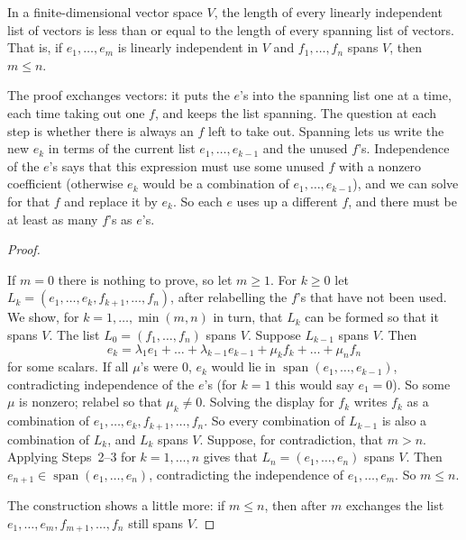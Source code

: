 \documentclass[10pt]{scrartcl}
\DeclareMathOperator{\spn}{span}
\begin{document}
\begin{theorem*}
  In a finite-dimensional vector space $V$, the length of every linearly independent list of vectors is less than or equal to the length of every spanning list of vectors. That is, if $e_1,\dots,e_m$ is linearly independent in $V$ and $f_1,\dots,f_n$ spans $V$, then $m\le n$.
\end{theorem*}
\begin{ideabox}
  The proof exchanges vectors: it puts the $e$'s into the spanning list one at a time, each time taking out one $f$, and keeps the list spanning. The question at each step is whether there is always an $f$ left to take out. Spanning lets us write the new $e_k$ in terms of the current list $e_1,\dots,e_{k-1}$ and the unused $f$'s. Independence of the $e$'s says that this expression must use some unused $f$ with a nonzero coefficient (otherwise $e_k$ would be a combination of $e_1,\dots,e_{k-1}$), and we can solve for that $f$ and replace it by $e_k$. So each $e$ uses up a different $f$, and there must be at least as many $f$'s as $e$'s.
\end{ideabox}
\begin{proof}
  \begin{steps}
    \ii If $m=0$ there is nothing to prove, so let $m\ge1$. For $k\ge0$ let $L_k=(e_1,\dots,e_k,f_{k+1},\dots,f_n)$, after relabelling the $f$'s that have not been used. We show, for $k=1,\dots,\min(m,n)$ in turn, that $L_k$ can be formed so that it spans $V$. The list $L_0=(f_1,\dots,f_n)$ spans $V$.
    \ii Suppose $L_{k-1}$ spans $V$. Then
    \[
      e_k=\lambda_1e_1+\dots+\lambda_{k-1}e_{k-1}+\mu_kf_k+\dots+\mu_nf_n
    \]
    for some scalars. If all $\mu$'s were $0$, $e_k$ would lie in $\spn(e_1,\dots,e_{k-1})$, contradicting independence of the $e$'s (for $k=1$ this would say $e_1=0$). So some $\mu$ is nonzero; relabel so that $\mu_k\ne0$.
    \ii Solving the display for $f_k$ writes $f_k$ as a combination of $e_1,\dots,e_k,f_{k+1},\dots,f_n$. So every combination of $L_{k-1}$ is also a combination of $L_k$, and $L_k$ spans $V$.
    \ii Suppose, for contradiction, that $m>n$. Applying Steps~2--3 for $k=1,\dots,n$ gives that $L_n=(e_1,\dots,e_n)$ spans $V$. Then $e_{n+1}\in\spn(e_1,\dots,e_n)$, contradicting the independence of $e_1,\dots,e_m$. So $m\le n$.
  \end{steps}
  The construction shows a little more: if $m\le n$, then after $m$ exchanges the list $e_1,\dots,e_m,f_{m+1},\dots,f_n$ still spans $V$.
\end{proof}
\end{document}
